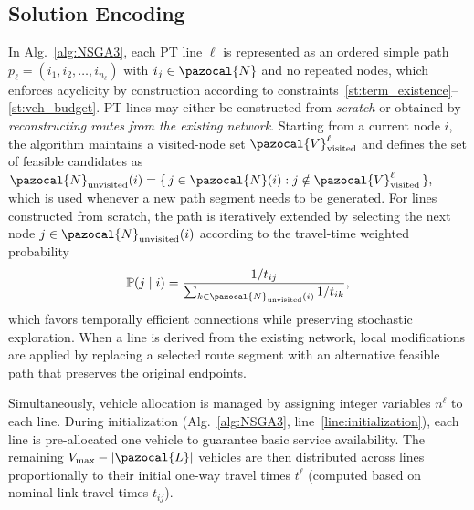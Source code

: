 \documentclass[a4paper,fleqn]{cas-sc}
\begin{document}
\subsection{Solution Encoding}\label{sec:encoding}

In Alg.~\ref{alg:NSGA3}, each PT line $\ell$ is represented as an ordered simple path
$p_\ell = (i_1, i_2, \dots, i_{n_\ell})$ with $i_j \in \pazocal{N}$ and no repeated nodes, which enforces acyclicity by construction according to constraints~\eqref{st:term_existence}--\eqref{st:veh_budget}.
PT lines may either be constructed from \textit{scratch} or obtained by \textit{reconstructing routes from the existing network}.
Starting from a current node $i$, the algorithm maintains a visited-node set $\pazocal{V}_{\text{visited}}^\ell$ and defines the set of feasible candidates as
$
\pazocal{N}_{\text{unvisited}}(i)
=
\{\, j \in \pazocal{N}(i) : j \notin \pazocal{V}_{\text{visited}}^\ell \,\},
$
which is used whenever a new path segment needs to be generated.
For lines constructed from scratch, the path is iteratively extended by selecting the next node $j \in \pazocal{N}_{\text{unvisited}}(i)$ according to the travel-time weighted probability
\begin{equation}
\label{eq:node-addition-probability}
\mathbb{P}(j \mid i)
=
\frac{1/t_{ij}}{\sum_{k\in\pazocal{N}_{\text{unvisited}}(i)} 1/t_{ik}},
\end{equation}
which favors temporally efficient connections while preserving stochastic exploration.
%
When a line is derived from the existing network, local modifications are applied by replacing a selected route segment with an alternative feasible path that preserves the original endpoints.

Simultaneously, vehicle allocation is managed by assigning integer variables $n^\ell$ to each line. 
%
During initialization (Alg.~\ref{alg:NSGA3}, line~\ref{line:initialization}),
each line is pre-allocated one vehicle to guarantee basic service availability.
The remaining $V_{\max}-|\pazocal{L}|$ vehicles are then distributed across
lines proportionally to their initial one-way travel times $t^\ell$ (computed based on nominal link travel times $t_{ij}$).
\end{document}
